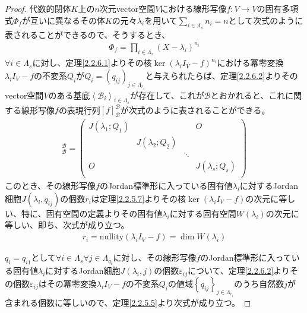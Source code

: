 \documentclass[dvipdfmx]{jsarticle}
\begin{document}
\begin{proof}
代数的閉体$K$上の$n$次元vector空間$V$における線形写像$f:V \rightarrow V$の固有多項式$\varPhi_{f}$が互いに異なるその体$K$の元々$\lambda_{i}$を用いて$\sum_{i \in \varLambda_{s}} n_{i} = n$として次式のように表されることができるので、そうするとき、
\begin{align*}
\varPhi_{f} = \prod_{i \in \varLambda_{s}} \left( X - \lambda_{i} \right)^{n_{i}}
\end{align*}
$\forall i \in \varLambda_{s}$に対し、定理\ref{2.2.6.1}よりその核$\ker\left( \lambda_{i}I_{V} - f \right)^{n_{i}}$における冪零変換$\lambda_{i}I_{V} - f$の不変系$Q_{i}$が$Q_{i} = \left( q_{ij} \right)_{j \in \varLambda_{r_{i}}}$と与えられたらば、定理\ref{2.2.6.2}よりそのvector空間$V$のある基底$\left\langle \mathcal{B}_{i} \right\rangle_{i \in \varLambda_{s}}$が存在して、これが$\mathcal{B}$とおかれると、これに関する線形写像$f$の表現行列$[ f]_{\mathcal{B}}^{\mathcal{B}}$が次式のように表されることができる。
\begin{align*}
[ f]_{\mathcal{B}}^{\mathcal{B}} = \begin{pmatrix}
J\left( \lambda_{1};Q_{1} \right) & \  & \  & O \\
\  & J\left( \lambda_{2};Q_{2} \right) & \  & \  \\
\  & \  & \ddots & \  \\
O & \  & \  & J\left( \lambda_{s};Q_{s} \right) \\
\end{pmatrix}
\end{align*}
このとき、その線形写像$f$のJordan標準形に入っている固有値$\lambda_{i}$に対するJordan細胞$J\left( \lambda_{i},q_{ij} \right)$の個数$r_{i}$は定理\ref{2.2.5.7}よりその核$\ker\left( \lambda_{i}I_{V} - f \right)$の次元に等しい、特に、固有空間の定義よりその固有値$\lambda_{i}$に対する固有空間$W\left( \lambda_{i} \right)$の次元に等しい、即ち、次式が成り立つ。
\begin{align*}
r_{i} = {\mathrm{nullity}}\left( \lambda_{i}I_{V} - f \right) = \dim{W\left( \lambda_{i} \right)}
\end{align*}\par
$q_{i} = q_{i1}$として$\forall i \in \varLambda_{s}\forall j \in \varLambda_{q_{i}}$に対し、その線形写像$f$のJordan標準形に入っている固有値$\lambda_{i}$に対するJordan細胞$J\left( \lambda_{i},j \right)$の個数$\varepsilon_{ij}$について、定理\ref{2.2.6.2}よりその個数$\varepsilon_{ij}$はその冪零変換$\lambda_{i}I_{V} - f$の不変系$Q_{i}$の値域$\left\{ q_{ij} \right\}_{j \in \varLambda_{r_{i}}}$のうち自然数$j$が含まれる個数に等しいので、定理\ref{2.2.5.5}より次式が成り立つ。

\end{proof}
\end{document}
